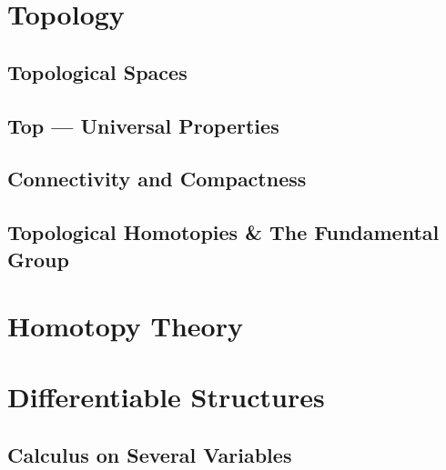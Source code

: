 





\part{Topology}

\chapter{Topological Spaces}









\chapter{\textbf{Top} --- Universal Properties}





\chapter{Connectivity and Compactness}



\chapter{Topological Homotopies \& The Fundamental Group}



\part{Homotopy Theory}



\part{Differentiable Structures}

\chapter{Calculus on Several Variables}

